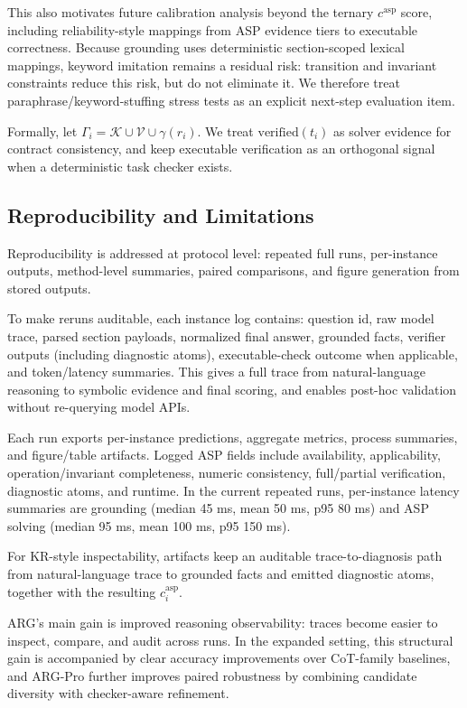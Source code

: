 \documentclass{article}
\begin{document}
This also motivates future calibration analysis beyond the ternary \(c^{\text{asp}}\) score, including reliability-style mappings from ASP evidence tiers to executable correctness.
Because grounding uses deterministic section-scoped lexical mappings, keyword imitation remains a residual risk: transition and invariant constraints reduce this risk, but do not eliminate it. We therefore treat paraphrase/keyword-stuffing stress tests as an explicit next-step evaluation item.

Formally, let \(\Gamma_i=\mathcal{K}\cup\mathcal{V}\cup\gamma(r_i)\). We treat \(\mathrm{verified}(t_i)\) as solver evidence for contract consistency, and keep executable verification as an orthogonal signal when a deterministic task checker exists.

\subsection{Reproducibility and Limitations}
Reproducibility is addressed at protocol level: repeated full runs, per-instance outputs, method-level summaries, paired comparisons, and figure generation from stored outputs.

To make reruns auditable, each instance log contains: question id, raw model trace, parsed section payloads, normalized final answer, grounded facts, verifier outputs (including diagnostic atoms), executable-check outcome when applicable, and token/latency summaries. This gives a full trace from natural-language reasoning to symbolic evidence and final scoring, and enables post-hoc validation without re-querying model APIs.

Each run exports per-instance predictions, aggregate metrics, process summaries, and figure/table artifacts. Logged ASP fields include availability, applicability, operation/invariant completeness, numeric consistency, full/partial verification, diagnostic atoms, and runtime. In the current repeated runs, per-instance latency summaries are grounding (median 45 ms, mean 50 ms, p95 80 ms) and ASP solving (median 95 ms, mean 100 ms, p95 150 ms).

For KR-style inspectability, artifacts keep an auditable trace-to-diagnosis path from natural-language trace to grounded facts and emitted diagnostic atoms, together with the resulting \(c_i^{\text{asp}}\).

ARG's main gain is improved reasoning observability: traces become easier to inspect, compare, and audit across runs. In the expanded setting, this structural gain is accompanied by clear accuracy improvements over CoT-family baselines, and ARG-Pro further improves paired robustness by combining candidate diversity with checker-aware refinement.
\end{document}
